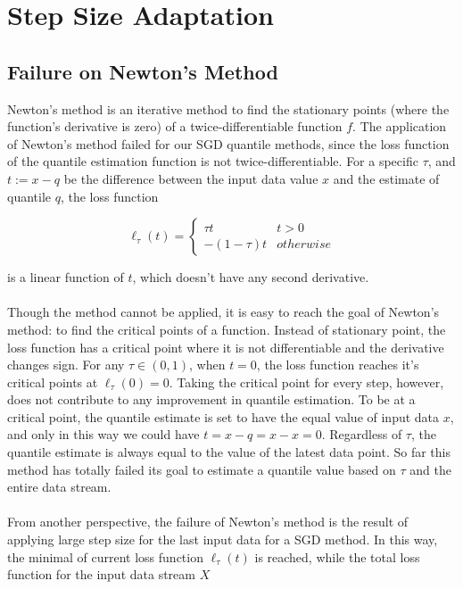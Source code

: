 \chapter{Step Size Adaptation}
\label{ch: stepsize_adaptation}

\graphicspath{{Figures/Stepsize_adapt/}{./}} 

\section{Failure on Newton's Method}
\label{sec: newton}
Newton's method is an iterative method to find the stationary points (where the function's derivative is zero) of a twice-differentiable function $f$. The application of Newton's method failed for our SGD quantile methods, since the loss function of the quantile estimation function is not twice-differentiable. For a specific $\tau$, and $t := x - q$ be the difference between the input data value $x$ and the estimate of quantile $q$, the loss function 

\begin{equation}
    \ell_\tau(t)= 
        \begin{cases}
            \tau t & t > 0\\
            -(1-\tau) t & otherwise
        \end{cases}
\end{equation}


is a linear function of $t$, which doesn't have any second derivative. 
\\\\
Though the method cannot be applied, it is easy to reach the goal of Newton's method: to find the critical points of a function. Instead of stationary point, the loss function has a critical point where it is not differentiable and the derivative changes sign. For any $\tau \in (0,1)$, when $t=0$, the loss function reaches it's critical points at $\ell_\tau(0) = 0$. Taking the critical point for every step, however, does not contribute to any improvement in quantile estimation. To be at a critical point, the quantile estimate is set to have the equal value of input data $x$, and only in this way we could have $t = x-q = x-x = 0$. Regardless of $\tau$, the quantile estimate is always equal to the value of the latest data point. So far this method has totally failed its goal to estimate a quantile value based on $\tau$ and the entire data stream.
\\\\
From another perspective, the failure of Newton's method is the result of applying large step size for the last input data for a SGD method. In this way, the minimal of current loss function $\ell_\tau(t)$ is reached, while the total loss function for the input data stream $X$

